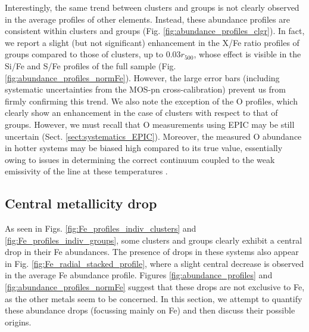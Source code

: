 \documentclass{aa}
\begin{document}
Interestingly, the same trend between clusters and groups is not clearly observed in the average profiles of other elements. Instead, these abundance profiles are consistent within clusters and groups (Fig. \ref{fig:abundance_profiles_clgr}). In fact, we report a slight (but not significant) enhancement in the X/Fe ratio profiles of groups compared to those of clusters, up to $0.03 r_{500}$, whose effect is visible in the Si/Fe and S/Fe profiles of the full sample (Fig. \ref{fig:abundance_profiles_normFe}). However, the large error bars (including systematic uncertainties from the MOS-pn cross-calibration) prevent us from firmly confirming this trend. We also note the exception of the O profiles, which clearly show an enhancement in the case of clusters with respect to that of groups. However, we must recall that O measurements using EPIC may be still uncertain (Sect. \ref{sect:systematics_EPIC}). Moreover, the measured O abundance in hotter systems may be biased high compared to its true value, essentially owing to issues in determining the correct continuum coupled to the weak emissivity of the  line at these temperatures \citep{2008ApJ...674..728R}.















\subsection{Central metallicity drop}\label{sect:Fe_drop}

As seen in Figs. \ref{fig:Fe_profiles_indiv_clusters} and \ref{fig:Fe_profiles_indiv_groups}, some clusters and groups clearly exhibit a central drop in their Fe abundances. The presence of drops in these systems also appear in Fig. \ref{fig:Fe_radial_stacked_profile}, where a slight central decrease is observed in the average Fe abundance profile. Figures \ref{fig:abundance_profiles} and \ref{fig:abundance_profiles_normFe} suggest that these drops are not exclusive to Fe, as the other metals seem to be concerned. In this section, we attempt to quantify these abundance drops (focussing mainly on Fe) and then discuss their possible origins.
\end{document}
